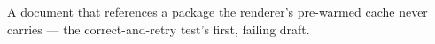 \documentclass{article}
\begin{document}
A document that references a package the renderer's pre-warmed cache never carries — the
correct-and-retry test's first, failing draft.
\end{document}
